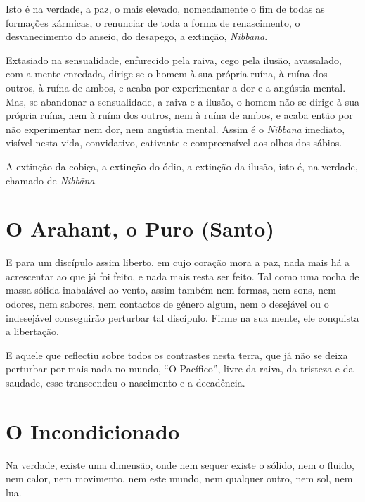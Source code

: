 Isto é na verdade, a paz, o mais elevado, nomeadamente o fim de todas as
formações kármicas, o renunciar de toda a forma de renascimento, o
desvanecimento do anseio, do desapego, a extinção, \emph{Nibbāna}.


Extasiado na sensualidade, enfurecido pela raiva, cego pela ilusão, avassalado,
com a mente enredada, dirige-se o homem à sua própria ruína, à ruína dos outros,
à ruína de ambos, e acaba por experimentar a dor e a angústia mental. Mas, se
abandonar a sensualidade, a raiva e a ilusão, o homem não se dirige à sua
própria ruína, nem à ruína dos outros, nem à ruína de ambos, e acaba então por
não experimentar nem dor, nem angústia mental. Assim é o \emph{Nibbāna}
imediato, visível nesta vida, convidativo, cativante e compreensível aos olhos
dos sábios.


A extinção da cobiça, a extinção do ódio, a extinção da ilusão, isto é, na
verdade, chamado de \emph{Nibbāna}.


\clearpage

\section{O Arahant, o Puro (Santo)}

E para um discípulo assim liberto, em cujo coração mora a paz, nada mais há a
acrescentar ao que já foi feito, e nada mais resta ser feito. Tal como uma rocha
de massa sólida inabalável ao vento, assim também nem formas, nem sons, nem
odores, nem sabores, nem contactos de género algum, nem o desejável ou o
indesejável conseguirão perturbar tal discípulo. Firme na sua mente, ele
conquista a libertação.


E aquele que reflectiu sobre todos os contrastes nesta terra, que já não se
deixa perturbar por mais nada no mundo, ``O Pacífico'', livre da raiva, da
tristeza e da saudade, esse transcendeu o nascimento e a decadência.


\section{O Incondicionado}

Na verdade, existe uma dimensão, onde nem sequer existe o sólido, nem o fluido,
nem calor, nem movimento, nem este mundo, nem qualquer outro, nem sol, nem lua.

